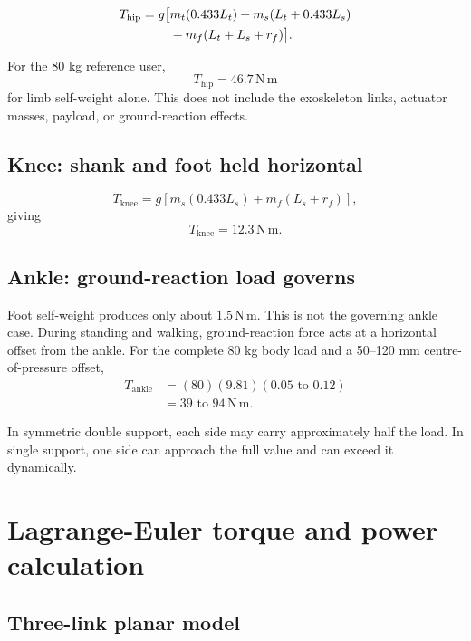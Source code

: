 \documentclass[11pt,a4paper]{article}
\newcommand{\unit}[1]{\ensuremath{\,\mathrm{#1}}}
\newcommand{\Nm}{\unit{N\,m}}
\begin{document}
\begin{align}
T_{\mathrm{hip}} = g\big[&m_t(0.433L_t)
  + m_s(L_t+0.433L_s) \notag\\
  &+m_f(L_t+L_s+r_f)\big].
\end{align}

For the 80 kg reference user,
\begin{equation}
  \boxed{T_{\mathrm{hip}} = 46.7\Nm}
\end{equation}
for limb self-weight alone. This does not include the exoskeleton links, actuator masses, payload, or ground-reaction effects.

\subsection{Knee: shank and foot held horizontal}

\begin{equation}
T_{\mathrm{knee}} = g\left[m_s(0.433L_s)+m_f(L_s+r_f)\right],
\end{equation}
giving
\begin{equation}
  \boxed{T_{\mathrm{knee}} = 12.3\Nm}.
\end{equation}

\subsection{Ankle: ground-reaction load governs}

Foot self-weight produces only about $1.5\Nm$. This is not the governing ankle case. During standing and walking, ground-reaction force acts at a horizontal offset from the ankle. For the complete 80 kg body load and a 50--120 mm centre-of-pressure offset,
\begin{align}
T_{\mathrm{ankle}}
 &= (80)(9.81)(0.05\text{ to }0.12) \\
 &= \boxed{39\text{ to }94\Nm}.
\end{align}

In symmetric double support, each side may carry approximately half the load. In single support, one side can approach the full value and can exceed it dynamically.

\section{Lagrange-Euler torque and power calculation}

\subsection{Three-link planar model}
\end{document}
